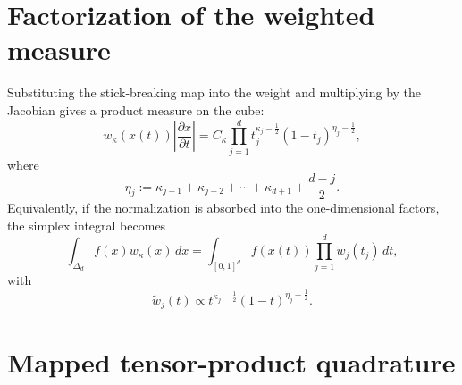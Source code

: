 \documentclass[11pt]{article}
\begin{document}
\section{Factorization of the weighted measure}

Substituting the stick-breaking map into the weight and multiplying by the Jacobian gives a product measure on the cube:
\begin{equation}
  w_{\kappa}(x(t))
  \left|\frac{\partial x}{\partial t}\right|
  = C_{\kappa}
  \prod_{j=1}^d
  t_j^{\kappa_j-\frac12}
  (1-t_j)^{\eta_j-\frac12},
  \label{eq:weight-factor}
\end{equation}
where
\begin{equation}
  \eta_j
  := \kappa_{j+1}+\kappa_{j+2}+\cdots+\kappa_{d+1}
     + \frac{d-j}{2}.
  \label{eq:eta-def}
\end{equation}
\noindent
Equivalently, if the normalization is absorbed into the one-dimensional factors, the simplex integral becomes
\begin{equation}
  \int_{\Delta_d} f(x)w_{\kappa}(x)\,dx
  =
  \int_{[0,1]^d}
  f(x(t))
  \prod_{j=1}^d
  \widetilde{w}_j(t_j)\,dt,
  \label{eq:simplex-to-cube}
\end{equation}
with
\begin{equation}
  \widetilde{w}_j(t)
  \propto
  t^{\kappa_j-\frac12}
  (1-t)^{\eta_j-\frac12}.
\end{equation}

\section{Mapped tensor-product quadrature}
\end{document}

